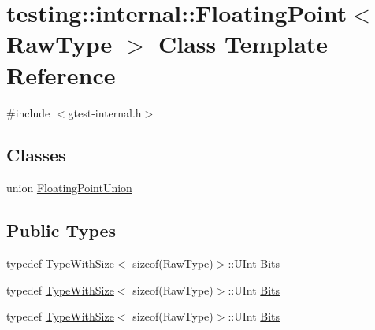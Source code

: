 \hypertarget{classtesting_1_1internal_1_1_floating_point}{}\section{testing\+::internal\+::Floating\+Point$<$ Raw\+Type $>$ Class Template Reference}
\label{classtesting_1_1internal_1_1_floating_point}


{\ttfamily \#include $<$gtest-\/internal.\+h$>$}

\subsection*{Classes}
\begin{DoxyCompactItemize}
\item 
union \mbox{\hyperlink{uniontesting_1_1internal_1_1_floating_point_1_1_floating_point_union}{Floating\+Point\+Union}}
\end{DoxyCompactItemize}
\subsection*{Public Types}
\begin{DoxyCompactItemize}
\item 
typedef \mbox{\hyperlink{classtesting_1_1internal_1_1_type_with_size}{Type\+With\+Size}}$<$ sizeof(Raw\+Type)$>$\+::U\+Int \mbox{\hyperlink{classtesting_1_1internal_1_1_floating_point_abf228bf6cd48f12c8b44c85b4971a731}{Bits}}
\item 
typedef \mbox{\hyperlink{classtesting_1_1internal_1_1_type_with_size}{Type\+With\+Size}}$<$ sizeof(Raw\+Type)$>$\+::U\+Int \mbox{\hyperlink{classtesting_1_1internal_1_1_floating_point_abf228bf6cd48f12c8b44c85b4971a731}{Bits}}
\item 
typedef \mbox{\hyperlink{classtesting_1_1internal_1_1_type_with_size}{Type\+With\+Size}}$<$ sizeof(Raw\+Type)$>$\+::U\+Int \mbox{\hyperlink{classtesting_1_1internal_1_1_floating_point_abf228bf6cd48f12c8b44c85b4971a731}{Bits}}
\end{DoxyCompactItemize}
